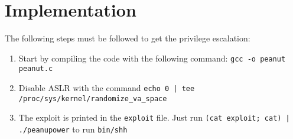 \section{Implementation}
\label{sec:implementation}
The following steps must be followed to get the privilege escalation:
\begin{enumerate}
\item Start by compiling the code with the following command: {\tt gcc -o peanut peanut.c}
\item Disable ASLR with the command {\tt echo 0 | tee /proc/sys/kernel/randomize\_va\_space}
\item The exploit is printed in the {\tt exploit} file. Just run {\tt (cat exploit; cat) | ./peanupower} to run {\tt bin/shh}
\end{enumerate}


